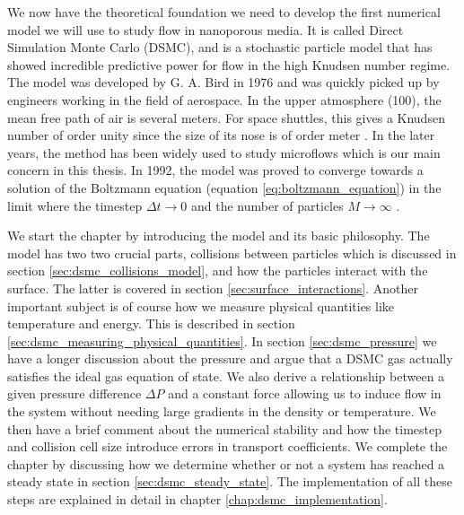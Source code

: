 We now have the theoretical foundation we need to develop the first numerical model we will use to study flow in nanoporous media. It is called Direct Simulation Monte Carlo (DSMC), and is a stochastic particle model that has showed incredible predictive power for flow in the high Knudsen number regime. The model was developed by G. A. Bird in 1976 and was quickly picked up by engineers working in the field of aerospace. In the upper atmosphere (\unit{100}{\kilo\meter}), the mean free path of air is several meters. For space shuttles, this gives a Knudsen number of order unity since the size of its nose is of order meter \cite{alexander1997direct}. In the later years, the method has been widely used to study microflows which is our main concern in this thesis. In 1992, the model was proved to converge towards a solution of the Boltzmann equation (equation \eqref{eq:boltzmann_equation}) in the limit where the timestep $\Delta t\rightarrow 0$ and the number of particles $M\rightarrow \infty$ \cite{wagner1992convergence}.

We start the chapter by introducing the model and its basic philosophy. The model has two two crucial parts, collisions between particles which is discussed in section \ref{sec:dsmc_collisions_model}, and how the particles interact with the surface. The latter is covered in section \ref{sec:surface_interactions}. Another important subject is of course how we measure physical quantities like temperature and energy. This is described in section \ref{sec:dsmc_measuring_physical_quantities}. In section \ref{sec:dsmc_pressure} we have a longer discussion about the pressure and argue that a DSMC gas actually satisfies the ideal gas equation of state. We also derive a relationship between a given pressure difference $\Delta P$ and a constant force allowing us to induce flow in the system without needing large gradients in the density or temperature. We then have a brief comment about the numerical stability and how the timestep and collision cell size introduce errors in transport coefficients. We complete the chapter by discussing how we determine whether or not a system has reached a steady state in section \ref{sec:dsmc_steady_state}. The implementation of all these steps are explained in detail in chapter \ref{chap:dsmc_implementation}.
